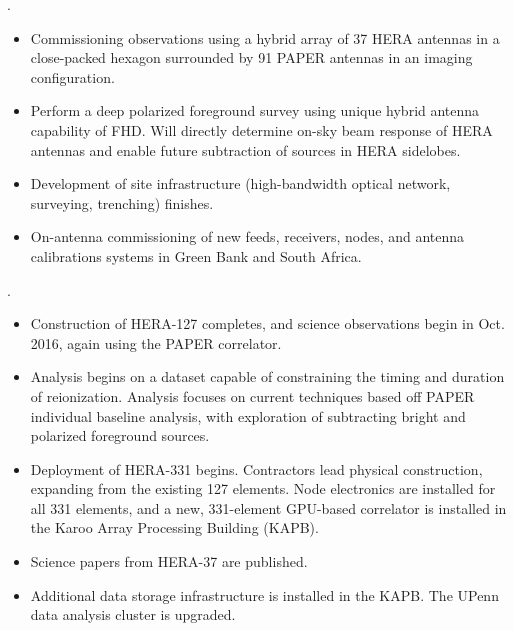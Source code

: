 \documentclass[preprint]{aastex}
\begin{document}
.  
\begin{itemize}\setlength{\parskip}{0pt}
\vspace{-7pt}
  \item Commissioning observations using a hybrid array of 37 HERA antennas in a close-packed hexagon surrounded by 91 PAPER antennas in an imaging configuration.
  \item Perform a deep polarized foreground survey using unique hybrid antenna capability of FHD. Will directly determine on-sky beam response of HERA antennas and enable future subtraction of sources in HERA sidelobes.
  \item Development of site infrastructure (high-bandwidth optical network, surveying, trenching) finishes.
  \item On-antenna commissioning of new feeds, receivers, nodes, and antenna calibrations systems in Green Bank and South Africa.
\end{itemize}


.
\begin{itemize}\setlength{\parskip}{0pt}
\vspace{-7pt}
  \item Construction of HERA-127 completes, and science observations begin in Oct. 2016, again using the PAPER correlator.
  \item Analysis begins on a dataset capable of constraining the timing and duration of reionization. Analysis focuses on current techniques based off PAPER individual baseline analysis, with exploration of subtracting bright and polarized foreground sources.
  \item Deployment of HERA-331 begins.  Contractors lead
physical construction, expanding from the existing 127 elements.  Node
electronics are installed for all 331 elements, and a new, 331-element
GPU-based correlator is installed in the Karoo Array Processing Building
(KAPB).
  \item Science papers from HERA-37 are published.
  \item  Additional data storage infrastructure is installed in the
KAPB.  The UPenn data analysis cluster is upgraded. 
\end{itemize}

\end{document}
